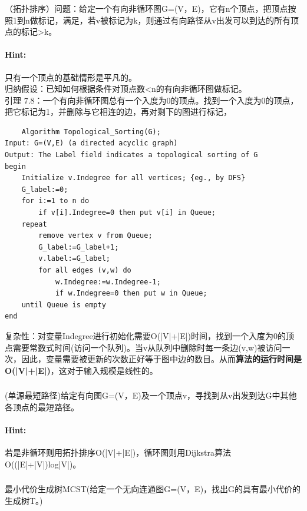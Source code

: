 \documentclass{article}
\begin{document}
      
           
          
     \subsubsection{}（拓扑排序）问题：给定一个有向非循环图G=(V，E)，它有n个顶点，把顶点按照1到n做标记，满足，若v被标记为k，则通过有向路径从v出发可以到达的所有顶点的标记>k。
     \paragraph{Hint:}
只有一个顶点的基础情形是平凡的。\\
归纳假设：已知如何根据条件对顶点数<n的有向非循环图做标记。\\
引理 7.8：一个有向非循环图总有一个入度为0的顶点。找到一个入度为0的顶点，把它标记为1，并删除与它相连的边，再对剩下的图进行标记，

  \lstset{language=C}
    \begin{lstlisting}
    Algorithm Topological_Sorting(G);
Input: G=(V,E) (a directed acyclic graph)
Output: The Label field indicates a topological sorting of G
begin
    Initialize v.Indegree for all vertices; {eg., by DFS}
    G_label:=0;
    for i:=1 to n do
        if v[i].Indegree=0 then put v[i] in Queue;
    repeat
        remove vertex v from Queue;
        G_label:=G_label+1;
        v.label:=G_label;
        for all edges (v,w) do
            w.Indegree:=w.Indegree-1;
            if w.Indegree=0 then put w in Queue;
    until Queue is empty
end

  \end{lstlisting}
  
     复杂性：对变量Indegree进行初始化需要O(|V|+|E|)时间，找到一个入度为0的顶点需要常数式时间(访问一个队列)。当v从队列中删除时每一条边(v,w)被访问一次，因此，变量需要被更新的次数正好等于图中边的数目。从而\textbf{算法的运行时间是O(|V|+|E|)}，这对于输入规模是线性的。
     
     
     \subsubsection{}(单源最短路径)给定有向图G=(V，E)及一个顶点v，寻找到从v出发到达G中其他各顶点的最短路径。
     \paragraph{Hint:}若是非循环则用拓扑排序O(|V|+|E|)，循环图则用Dijkstra算法O((|E|+|V|)log|V|)。
    
     \subsubsection{}最小代价生成树MCST(给定一个无向连通图G=(V，E)，找出G的具有最小代价的生成树T。)
\end{document}

